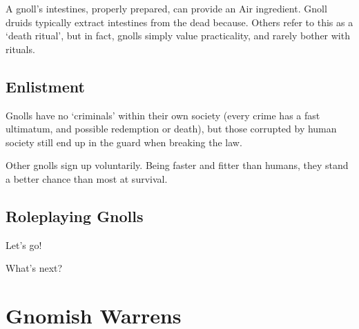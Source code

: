\begin{multicols}{2}

A gnoll's intestines, properly prepared, can provide an Air \gls{ingredient}.
Gnoll druids typically extract intestines from the dead because.
Others refer to this as a `death ritual', but in fact, gnolls simply value practicality, and rarely bother with rituals.

\subsection{Enlistment}

Gnolls have no `criminals' within their own society (every crime has a fast ultimatum, and possible redemption or death), but those corrupted by human society still end up in the \gls{guard} when breaking the law.

Other gnolls sign up voluntarily.
Being faster and fitter than humans, they stand a better chance than most at survival.

\subsection{Roleplaying Gnolls}

Let's go!


{\raggedleft What's next?\par}

\end{multicols}

\section[Gnomes]{Gnomish Warrens \Gn}
\label{gnomishWarrens}

